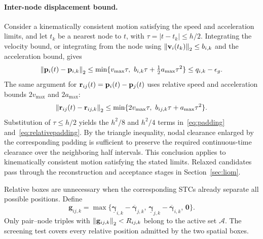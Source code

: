 \paragraph{Inter-node displacement bound.}
Consider a kinematically consistent motion satisfying the speed and acceleration limits, and let $t_k$ be a nearest node to $t$, with $\tau=|t-t_k|\leq h/2$. Integrating the velocity bound, or integrating from the node using $\left\lVert \mathbf{v}_i(t_k)\right\rVert_2\leq b_{i,k}$ and the acceleration bound, gives
\begin{equation}
 \left\lVert \mathbf{p}_i(t)-\mathbf{p}_{i,k}\right\rVert_2
 \leq\min\{v_{\max}\tau,\ b_{i,k}\tau+\tfrac12a_{\max}\tau^2\}
 \leq q_{i,k}-\epsilon_g.
 \label{eq:single-displacement}
\end{equation}
The same argument for $\mathbf r_{ij}(t)=\mathbf{p}_i(t)-\mathbf{p}_j(t)$ uses relative speed and acceleration bounds $2v_{\max}$ and $2a_{\max}$:
\begin{equation}
 \left\lVert \mathbf r_{ij}(t)-\mathbf r_{ij,k}\right\rVert_2
 \leq\min\{2v_{\max}\tau,\ b_{ij,k}\tau+a_{\max}\tau^2\}.
 \label{eq:relative-displacement}
\end{equation}
Substitution of $\tau\leq h/2$ yields the $h^2/8$ and $h^2/4$ terms in~\eqref{eq:padding} and~\eqref{eq:relativepadding}. By the triangle inequality, nodal clearance enlarged by the corresponding padding is sufficient to preserve the required continuous-time clearance over the neighboring half intervals. This conclusion applies to kinematically consistent motion satisfying the stated limits. Relaxed candidates pass through the reconstruction and acceptance stages in Section~\ref{sec:liom}.

Relative boxes are unnecessary when the corresponding STCs already separate all possible positions. Define
\begin{equation}
 \mathbf g_{ij,k}=\max\{\underline{\boldsymbol\gamma}_{i,k}-\overline{\boldsymbol\gamma}_{j,k},\,
 \underline{\boldsymbol\gamma}_{j,k}-\overline{\boldsymbol\gamma}_{i,k},\,\mathbf0\}.
 \label{eq:screen}
\end{equation}
Only pair--node triples with $\left\lVert \mathbf g_{ij,k}\right\rVert_2<R_{ij,k}$ belong to the active set $\mathcal A$. The screening test covers every relative position admitted by the two spatial boxes.

